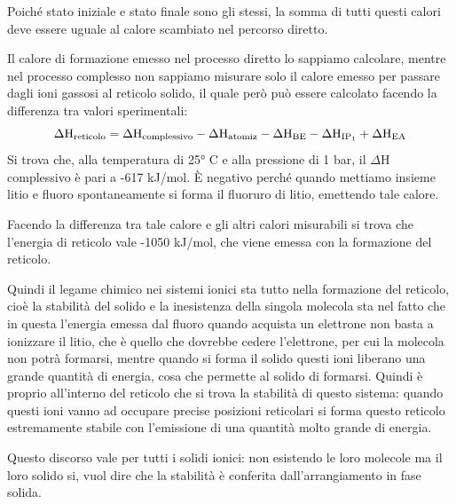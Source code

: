 \vspace{-0.2cm}Poiché stato iniziale e stato finale sono gli stessi, la somma di tutti questi calori deve essere uguale al calore scambiato nel percorso diretto.

Il calore di formazione emesso nel processo diretto lo sappiamo calcolare, mentre nel processo complesso non sappiamo misurare solo il calore emesso per passare dagli ioni gassosi al reticolo solido, il quale però può essere calcolato facendo la differenza tra valori sperimentali:
$$\Delta\rm{H}_{reticolo}=\Delta\rm{H}_{complessivo} - \Delta\rm{H}_{atomiz} - \Delta\rm{H}_{BE} - \Delta\rm{H}_{IP_1} + \Delta\rm{H}_{EA}$$
Si trova che, alla temperatura di 25° C e alla pressione di 1 bar, il $\Delta$H complessivo è pari a -617 kJ/mol. È negativo perché quando mettiamo insieme litio e fluoro spontaneamente si forma il fluoruro di litio, emettendo tale calore.

Facendo la differenza tra tale calore e gli altri calori misurabili si trova che l'energia di reticolo vale -1050 kJ/mol, che viene emessa con la formazione del reticolo.

Quindi il legame chimico nei sistemi ionici sta tutto nella formazione del reticolo, cioè la stabilità del solido e la inesistenza della singola molecola sta nel fatto che in questa l'energia emessa dal fluoro quando acquista un elettrone non basta a ionizzare il litio, che è quello che dovrebbe cedere l'elettrone, per cui la molecola non potrà formarsi, mentre quando si forma il solido questi ioni liberano una grande quantità di energia, cosa che permette al solido di formarsi. Quindi è proprio all'interno del reticolo che si trova la stabilità di questo sistema: quando questi ioni vanno ad occupare precise posizioni reticolari si forma questo reticolo estremamente stabile con l'emissione di una quantità molto grande di energia.

Questo discorso vale per tutti i solidi ionici: non esistendo le loro molecole ma il loro solido si, vuol dire che la stabilità è conferita dall'arrangiamento in fase solida.

